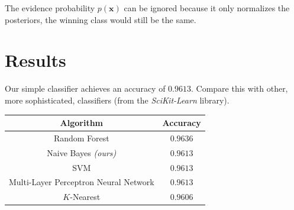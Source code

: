\documentclass[14pt]{extarticle}
\begin{document}
    The evidence probability $p(\boldsymbol{x})$ can be ignored because it only
    normalizes the posteriors, the winning class would still be the same.

    \section{Results}
    Our simple classifier achieves an accuracy of $0.9613$. Compare this with
    other, more sophisticated, classifiers (from the \emph{SciKit-Learn}
    library).

    \begin{center}
    \begin{tabular}{cc}
        Algorithm & Accuracy \\
        \midrule
        Random Forest & $0.9636$ \\
        Naive Bayes \textit{(ours)} & $0.9613$ \\
        SVM & $0.9613$ \\
        Multi-Layer Perceptron Neural Network & $0.9613$ \\
        $K$-Nearest & $0.9606$
    \end{tabular}
    \end{center}
\end{document}
